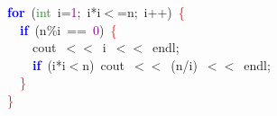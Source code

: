 \noindent
\mbox{}\textbf{\textcolor{Blue}{for}}\ \textcolor{BrickRed}{(}\textcolor{ForestGreen}{int}\ i\textcolor{BrickRed}{=}\textcolor{Purple}{1}\textcolor{BrickRed}{;}\ i\textcolor{BrickRed}{*}i\textcolor{BrickRed}{$<$=}n\textcolor{BrickRed}{;}\ i\textcolor{BrickRed}{++)}\ \textcolor{Red}{\{} \\
\mbox{}\ \ \textbf{\textcolor{Blue}{if}}\ \textcolor{BrickRed}{(}n\textcolor{BrickRed}{\%}i\ \textcolor{BrickRed}{==}\ \textcolor{Purple}{0}\textcolor{BrickRed}{)}\ \textcolor{Red}{\{} \\
\mbox{}\ \ \ \ cout\ \textcolor{BrickRed}{$<$$<$}\ i\ \textcolor{BrickRed}{$<$$<$}\ endl\textcolor{BrickRed}{;} \\
\mbox{}\ \ \ \ \textbf{\textcolor{Blue}{if}}\ \textcolor{BrickRed}{(}i\textcolor{BrickRed}{*}i\textcolor{BrickRed}{$<$}n\textcolor{BrickRed}{)}\ cout\ \textcolor{BrickRed}{$<$$<$}\ \textcolor{BrickRed}{(}n\textcolor{BrickRed}{/}i\textcolor{BrickRed}{)}\ \textcolor{BrickRed}{$<$$<$}\ endl\textcolor{BrickRed}{;} \\
\mbox{}\ \ \textcolor{Red}{\}} \\
\mbox{}\textcolor{Red}{\}}\  \\

